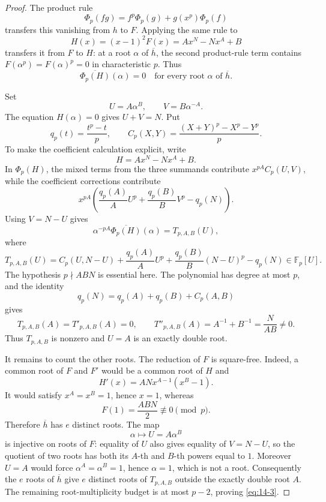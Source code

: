 \documentclass[11pt]{article}
\numberwithin{equation}{section}
\theoremstyle{definition}
\begin{document}
\begin{proof}
The product rule
\[
 \Phi_p(fg)=f^p\Phi_p(g)+g(x^p)\Phi_p(f)
\]
transfers this vanishing from \(h\) to \(F\).  Applying the
same rule to
\[
 H(x)=(x-1)^2F(x)=Ax^N-Nx^A+B
\]
transfers it from \(F\) to \(H\): at a root \(\alpha\) of
\(\overline h\), the second product-rule term contains
\(F(\alpha^p)=F(\alpha)^p=0\) in characteristic \(p\).  Thus
\[
 \overline{\Phi_p(H)}(\alpha)=0
 \quad\text{for every root }\alpha\text{ of }\overline h.
\]

Set
\[
 U=A\alpha^B,\qquad V=B\alpha^{-A}.
\]
The equation \(H(\alpha)=0\) gives \(U+V=N\).  Put
\[
 q_p(t)=\frac{t^p-t}{p},\qquad
 C_p(X,Y)=\frac{(X+Y)^p-X^p-Y^p}{p}.
\]
To make the coefficient calculation explicit, write
\[
 H=Ax^N-Nx^A+B.
\]
In \(\Phi_p(H)\), the mixed terms from the three summands contribute
\(x^{pA}C_p(U,V)\), while the coefficient corrections contribute
\[
 x^{pA}\left(\frac{q_p(A)}A U^p
 +\frac{q_p(B)}B V^p-q_p(N)\right).
\]
Using \(V=N-U\) gives
\begin{equation}
 \alpha^{-pA}\overline{\Phi_p(H)}(\alpha)
 =T_{p,A,B}(U),
 \label{eq:14-6}
\end{equation}
where
\begin{equation}
 T_{p,A,B}(U)=
 C_p(U,N-U)
 +\frac{q_p(A)}A U^p
 +\frac{q_p(B)}B(N-U)^p
 -q_p(N)
 \in\mathbb F_p[U].
 \label{eq:14-7}
\end{equation}
The hypothesis \(p\nmid ABN\) is essential here.  The polynomial has degree
at most \(p\), and the identity
\[
 q_p(N)=q_p(A)+q_p(B)+C_p(A,B)
\]
gives
\[
 T_{p,A,B}(A)=T'_{p,A,B}(A)=0,
 \qquad
 T''_{p,A,B}(A)=A^{-1}+B^{-1}=\frac N{AB}\neq0.
\]
Thus \(T_{p,A,B}\) is nonzero and \(U=A\) is an exactly double root.

It remains to count the other roots.  The reduction of \(F\) is square-free.
Indeed, a common root of \(F\) and \(F'\) would be a common root of \(H\)
and
\[
 H'(x)=ANx^{A-1}(x^B-1).
\]
It would satisfy \(x^A=x^B=1\), hence \(x=1\), whereas
\[
 F(1)=\frac{ABN}{2}\not\equiv0\pmod p.
\]
Therefore \(\overline h\) has \(e\) distinct roots.  The map
\[
 \alpha\longmapsto U=A\alpha^B
\]
is injective on roots of \(F\): equality of \(U\) also gives equality of
\(V=N-U\), so the quotient of two roots has both its \(A\)-th and
\(B\)-th powers equal to \(1\).  Moreover \(U=A\) would force
\(\alpha^A=\alpha^B=1\), hence \(\alpha=1\), which is not a root.
Consequently the \(e\) roots of \(\overline h\) give \(e\) distinct roots
of \(T_{p,A,B}\) outside the exactly double root \(A\).  The remaining
root-multiplicity budget is at most \(p-2\), proving \eqref{eq:14-3}.
\end{proof}
\end{document}
